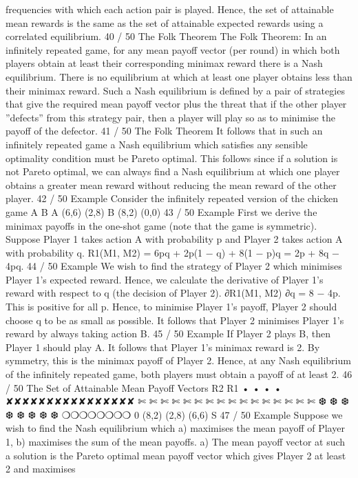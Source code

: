 frequencies with which each action pair is played.
Hence, the set of attainable mean rewards is the same as the set of
attainable expected rewards using a correlated equilibrium.
40 / 50
The Folk Theorem
The Folk Theorem: In an infinitely repeated game, for any mean
payoff vector (per round) in which both players obtain at least
their corresponding minimax reward there is a Nash equilibrium.
There is no equilibrium at which at least one player obtains less
than their minimax reward.
Such a Nash equilibrium is defined by a pair of strategies that give
the required mean payoff vector plus the threat that if the other
player ”defects” from this strategy pair, then a player will play so
as to minimise the payoff of the defector.
41 / 50
The Folk Theorem
It follows that in such an infinitely repeated game a Nash
equilibrium which satisfies any sensible optimality condition must
be Pareto optimal.
This follows since if a solution is not Pareto optimal, we can always
find a Nash equilibrium at which one player obtains a greater mean
reward without reducing the mean reward of the other player.
42 / 50
Example
Consider the infinitely repeated version of the chicken game
A B
A (6,6) (2,8)
B (8,2) (0,0)
43 / 50
Example
First we derive the minimax payoffs in the one-shot game (note
that the game is symmetric).
Suppose Player 1 takes action A with probability p and Player 2
takes action A with probability q.
R1(M1, M2) = 6pq + 2p(1 − q) + 8(1 − p)q = 2p + 8q − 4pq.
44 / 50
Example
We wish to find the strategy of Player 2 which minimises Player 1’s
expected reward. Hence, we calculate the derivative of Player 1’s
reward with respect to q (the decision of Player 2).
∂R1(M1, M2)
∂q
= 8 − 4p.
This is positive for all p. Hence, to minimise Player 1’s payoff,
Player 2 should choose q to be as small as possible.
It follows that Player 2 minimises Player 1’s reward by always
taking action B.
45 / 50
Example
If Player 2 plays B, then Player 1 should play A.
It follows that Player 1’s minimax reward is 2. By symmetry, this is
the minimax payoff of Player 2.
Hence, at any Nash equilibrium of the infinitely repeated game,
both players must obtain a payoff of at least 2.
46 / 50
The Set of Attainable Mean Payoff Vectors
R2
R1
•
•
•
•
✘✘✘✘✘✘✘✘✘✘✘✘✘✘✘✘
✄
✄
✄
✄
✄
✄
✄
✄
✄
✄
✄
✄
✄
✄
✄
✄
❆
❆
❆
❆
❆
❆
❆
❆
❍❍❍❍❍❍❍❍
0
(8,2)
(2,8)
(6,6)
S
47 / 50
Example
Suppose we wish to find the Nash equilibrium which a) maximises
the mean payoff of Player 1, b) maximises the sum of the mean
payoffs.
a) The mean payoff vector at such a solution is the Pareto optimal
mean payoff vector which gives Player 2 at least 2 and maximises
